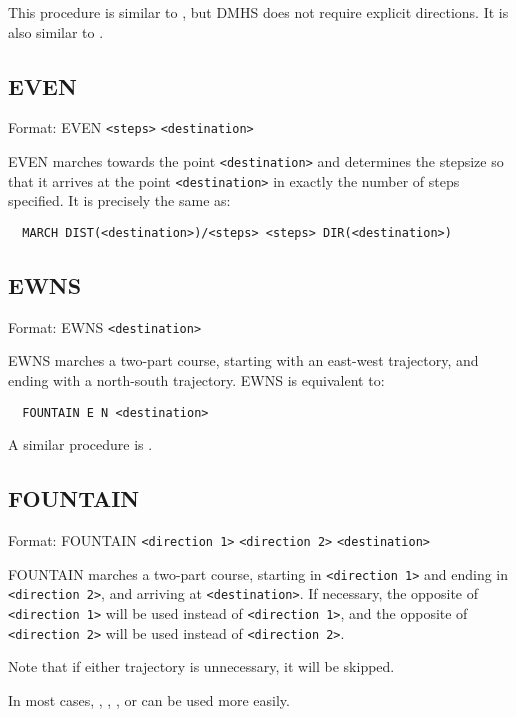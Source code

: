 This procedure is similar to , but DMHS does
not require explicit directions.  It is also similar to .

\subsection{EVEN}\label{even}

Format: EVEN \verb$<steps>$ \verb$<destination>$

EVEN marches towards the point \verb$<destination>$ and determines the
stepsize so that it arrives at the point \verb$<destination>$ in exactly
the number of steps specified.  It is precisely the same as:
\begin{verbatim}
  MARCH DIST(<destination>)/<steps> <steps> DIR(<destination>)
\end{verbatim}

\subsection{EWNS}\label{ewns}

Format: EWNS \verb$<destination>$

EWNS marches a two-part course, starting with an east-west trajectory, and
ending with a north-south trajectory.  EWNS is equivalent to:
\begin{verbatim}
  FOUNTAIN E N <destination>
\end{verbatim}

A similar procedure is .

\subsection{FOUNTAIN}\label{fountain}

Format: FOUNTAIN \verb$<direction 1>$ \verb$<direction 2>$ \verb$<destination>$

FOUNTAIN marches a two-part course, starting in \verb$<direction 1>$ and
ending in \verb$<direction 2>$, and arriving at \verb$<destination>$.
If necessary, the opposite of \verb$<direction 1>$ will be used instead
of \verb$<direction 1>$, and the opposite of \verb$<direction 2>$ will
be used instead of \verb$<direction 2>$.

Note that if either trajectory is unnecessary, it will be skipped.

In most cases, , ,
, or  can be used more easily.

